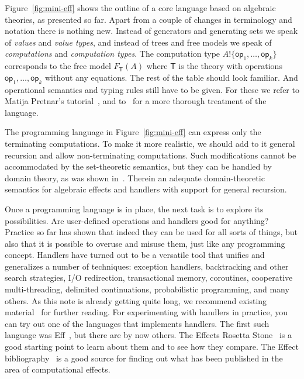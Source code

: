\documentclass{amsart}
\newcommand{\theory}[1]{\mathsf{#1}} %
\newcommand{\Free}[2]{F_{\theory{#1}}(#2)} %
\newcommand{\op}[1]{\mathsf{op}_{#1}} %
\newcommand{\dirt}[2]{#1 \mathbin{!} #2} %
\begin{document}
Figure~\ref{fig:mini-eff} shows the outline of a core language based on
algebraic theories, as presented so far. Apart from a couple of changes in
terminology and notation there is nothing new. Instead of generators and
generating sets we speak of \emph{values} and \emph{value types}, and instead of
trees and free models we speak of \emph{computations} and \emph{computation
  types}. The computation type $\dirt{A}{\{\op{1}, \ldots, \op{k}\}}$
corresponds to the free model $\Free{T}{A}$ where $\theory{T}$ is the theory
with operations $\op{1}, \ldots, \op{k}$ without any equations. The rest of the
table should look familiar. And operational semantics and typing rules still
have to be given. For these we refer to Matija Pretnar's
tutorial~\cite{pretnar15:_introd_algeb_effec_handl}, and
to~\cite{bauer14:_effec_system_algeb_effec_handl,pretnar14:_infer_algeb_effec}
for a more thorough treatment of the language.

The programming language in Figure~\ref{fig:mini-eff} can express only the
terminating computations. To make it more realistic, we should add to it general
recursion and allow non-terminating computations. Such modifications cannot be
accommodated by the set-theoretic semantics, but they can be handled by domain
theory, as was shown in~\cite{bauer14:_effec_system_algeb_effec_handl}. Therein an adequate
domain-theoretic semantics for algebraic effects and handlers with support for
general recursion.

Once a programming language is in place, the next task is to explore its
possibilities. Are user-defined operations and handlers good for anything?
Practice so far has shown that indeed they can be used for all sorts of things,
but also that it is possible to overuse and misuse them, just like any
programming concept. Handlers have turned out to be a versatile tool that
unifies and generalizes a number of techniques: exception handlers, backtracking
and other search strategies, I/O redirection, transactional memory, coroutines,
cooperative multi-threading, delimited continuations, probabilistic programming,
and many others. As this note is already getting quite long, we recommend
existing
material~\cite{pretnar15:_introd_algeb_effec_handl,bauer15:_progr,kammar13:_handl}
for further reading. For experimenting with handlers in practice, you can try
out one of the languages that implements handlers. The first such language was
Eff~\cite{bauer:_eff}, but there are by now others. The Effects Rosetta
Stone~\cite{effec_roset_stone} is a good starting point to learn about them and
to see how they compare. The Effect bibliography~\cite{effec} is a good source
for finding out what has been published in the area of computational effects.
\end{document}
